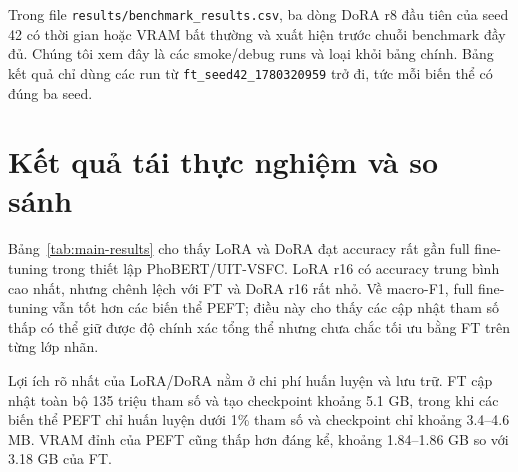 \documentclass{article}
\theoremstyle{plain}
\theoremstyle{definition}
\begin{document}
Trong file \texttt{results/benchmark\_results.csv}, ba dòng DoRA r8 đầu tiên của seed 42 có thời gian hoặc VRAM bất thường và xuất hiện trước chuỗi benchmark đầy đủ. Chúng tôi xem đây là các smoke/debug runs và loại khỏi bảng chính. Bảng kết quả chỉ dùng các run từ \texttt{ft\_seed42\_1780320959} trở đi, tức mỗi biến thể có đúng ba seed.

\section{Kết quả tái thực nghiệm và so sánh}

\begin{table}[t]
\caption{Kết quả benchmark trên UIT-VSFC. Giá trị được báo cáo theo trung bình $\pm$ độ lệch chuẩn trên ba seed.}
\label{tab:main-results}
\centering
{}
\end{table}

Bảng~\ref{tab:main-results} cho thấy LoRA và DoRA đạt accuracy rất gần full fine-tuning trong thiết lập PhoBERT/UIT-VSFC. LoRA r16 có accuracy trung bình cao nhất, nhưng chênh lệch với FT và DoRA r16 rất nhỏ. Về macro-F1, full fine-tuning vẫn tốt hơn các biến thể PEFT; điều này cho thấy các cập nhật tham số thấp có thể giữ được độ chính xác tổng thể nhưng chưa chắc tối ưu bằng FT trên từng lớp nhãn.

Lợi ích rõ nhất của LoRA/DoRA nằm ở chi phí huấn luyện và lưu trữ. FT cập nhật toàn bộ 135 triệu tham số và tạo checkpoint khoảng 5.1 GB, trong khi các biến thể PEFT chỉ huấn luyện dưới 1\% tham số và checkpoint chỉ khoảng 3.4--4.6 MB. VRAM đỉnh của PEFT cũng thấp hơn đáng kể, khoảng 1.84--1.86 GB so với 3.18 GB của FT.
\end{document}
